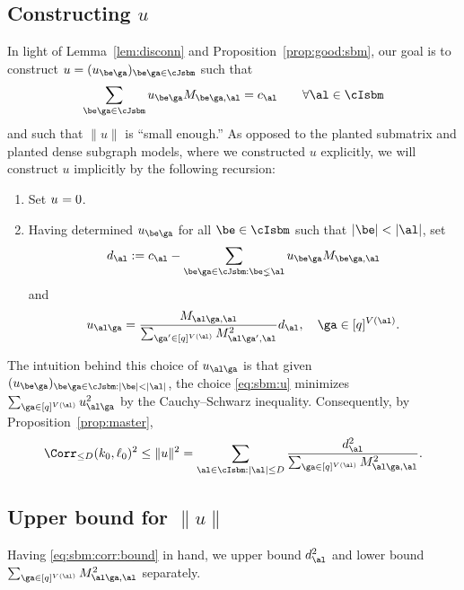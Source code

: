 \documentclass[11pt]{article}
\begin{document}
\subsection{Constructing $u$}
\label{subsec:SBM:u}
In light of Lemma~\ref{lem:disconn} and Proposition~\ref{prop:good:sbm}, our goal is to construct $u=(u_{\be\ga})_{\be\ga\in \cJsbm}$ such that 
\begin{equation*}
    \sum_{\be\ga \in \cJsbm} u_{\be\ga}M_{\be\ga,\al}=c_{\al} \qquad \forall\al\in \cIsbm
\end{equation*}
and such that $\|u\|$ is ``small enough.'' As opposed to the planted submatrix and planted dense subgraph models, where we constructed $u$ explicitly, we will construct $u$ implicitly by the following recursion:
\begin{enumerate}
    \item Set $u_{\empty\empty}=0$. 
    \item Having  determined $u_{\be\ga}$ for all $\be\in \cIsbm$ such that $|\be|<|\al|$, set
    \begin{equation}\label{eq:def:d}
   d_{\al}:=c_{\al}-\sum_{\be\ga\in \cJsbm:\be\lneq\al}u_{\be\ga}M_{\be\ga,\al}
    \end{equation}
    and
\begin{equation}\label{eq:sbm:u}
    u_{\al\ga}=\frac{M_{\al\ga,\al}}{\sum_{\ga'\in [q]^{V(\al)}}M_{\al \ga', \al}^2}d_{\al},~~~\ga\in [q]^{V(\al)}.
    \end{equation}
\end{enumerate}
The intuition behind this choice of $u_{\al\ga}$ is that given $(u_{\be\ga})_{\be\ga\in \cJsbm: |\be|<|\al|}$, the choice \eqref{eq:sbm:u} minimizes $\sum_{\ga\in [q]^{V(\al)}}u_{\al\ga}^2$ by the Cauchy--Schwarz inequality. Consequently, by Proposition~\ref{prop:master},
\begin{equation}\label{eq:sbm:corr:bound}
\Corr_{\leq D}(k_0,\ell_0)^2 \leq \|u\|^2=\sum_{\al\in \cIsbm:|\al|\leq D} \frac{d_\al^2}{\sum_{\ga\in [q]^{V(\al)}}M_{\al\ga,\al}^2}.
\end{equation}


\subsection{Upper bound for $\|u\|$}
Having \eqref{eq:sbm:corr:bound} in hand, we upper bound $d_{\al}^2$ and lower bound $\sum_{\ga\in [q]^{V(\al)}}M_{\al\ga,\al}^2$ separately. 
\end{document}

